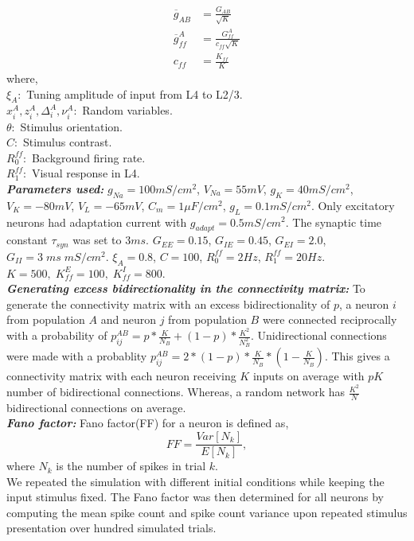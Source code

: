\begin{align}
\overline{g}_{AB} &= \frac{G_{AB}}{\sqrt{K}} \\
\overline{g}^{A}_{ff} &= \frac{G^{A}_{ff}}{c_{ff} \sqrt{K}} \\
c_{ff} &= \frac{K_{ff}}{K}
\end{align}
where, \\
$\xi_A:$ Tuning amplitude of input from L4 to L2/3. \\
$x^A_i, z^A_i , \Delta^A_i , \nu^A_i:$ Random variables. \\
$\theta:$ Stimulus orientation. \\  
$C:$ Stimulus contrast. \\
$R_0^{ff}:$ Background firing rate. \\
$R_1^{ff}:$ Visual response in L4. \\

\textbf{\textit{Parameters used:}} 
$g_{Na}=100mS / cm^2$, $V_{Na} = 55mV$, 
$g_{K} = 40mS / cm^2$, $V_{K} = -80mV$,
$V_L = -65mV$, 
$C_m = 1 \mu F / cm^2$, 
$g_L = 0.1 mS / cm^2$. 
Only excitatory neurons had adaptation current with $g_{adapt} = 0.5 mS/cm^2$. The synaptic time constant $\tau_{syn}$ was set to $3ms$. $G_{EE} = 0.15$, $G_{IE} = 0.45$, $G_{EI} = 2.0$, $G_{II} = 3 \; ms \; mS / cm^2$. 
$\xi_A = 0.8$, $C = 100$, $R_0^{ff} = 2Hz$, $R_1^{ff} = 20Hz$. 
$K = 500, \; K_{ff}^{E} = 100, \; K_{ff}^{I} = 800$. \\

\textbf{\textit{Generating excess bidirectionality in the connectivity matrix:}}
To generate the connectivity matrix with an excess bidirectionality of $p$, a neuron $i$ from population $A$ and neuron $j$ from population $B$  were connected reciprocally with a  probability of $p_{ij}^{AB} = p * \frac{K}{N_{B}} + (1 - p) * \frac{K^2}{N_{B}^2}$. 
Unidirectional connections were  made with a probablity $p_{ij}^{AB}  = 2 * (1 - p) * \frac{K}{N_{B}} * (1 -  \frac{K}{N_{B}})$. This gives a connectivity matrix with each neuron receiving $K$ inputs on average with $pK$ number of bidirectional connections. Whereas, a random network has $\frac{K^2}{N}$ bidirectional connections on average. \\

\textbf{\textit{Fano factor:}}
Fano factor(FF) for a neuron is defined as,\\
\begin{equation}
FF = \frac{Var[N_{k}]}{E[N_{k}]},
\end{equation}
where $N_{k}$ is the number of spikes in trial $k$. \\
We repeated the simulation with different initial conditions while keeping the input stimulus fixed. The Fano factor was then determined for all neurons by computing the mean spike count and spike count variance upon repeated stimulus presentation over hundred simulated trials. \\

